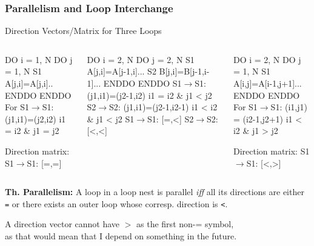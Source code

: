 \documentclass{beamer}
\newcommand{\emp}[1]{\textcolor{DikuRed}{ #1}}
\newcommand{\mymath}[1]{$ #1 $}
\begin{document}
\begin{frame}[fragile,t]
  \frametitle{Parallelism and Loop Interchange} %

\begin{block}{Direction Vectors/Matrix for Three Loops }
\begin{columns}
\begin{colorcode}
  DO i = 1, N
    DO j = 1, N
S1    A[j,i]=A[j,i]..
    ENDDO
  ENDDO
For S1\mymath{\rightarrow}S1: 
    (j1,i1)=(j2,i2) 
    i1 \emp{=} i2 \& j1 \emp{=} j2

Direction matrix:
S1\mymath{\rightarrow}S1: \emp{[=,=]}
\end{colorcode}
\begin{colorcode}
  DO i = 2, N
    DO j = 2, N
S1    A[j,i]=A[j-1,i]...
S2    B[j,i]=B[j-1,i-1]...
    ENDDO
  ENDDO
S1\mymath{\rightarrow}S1: (j1,i1)=(j2-1,i2)
        i1 \emp{=} i2 \& j1 \emp{<} j2
S2\mymath{\rightarrow}S2: (j1,i1)=(j2-1,i2-1)
        i1 \emp{<} i2 \& j1 \emp{<} j2
S1\mymath{\rightarrow}S1: \emp{[=,<]}
S2\mymath{\rightarrow}S2: \emp{[<,<]}
\end{colorcode}
\begin{colorcode}
  DO i = 2, N
    DO j = 1, N
S1    A[i,j]=A[i-1,j+1]...
    ENDDO
  ENDDO
For S1\mymath{\rightarrow}S1: 
    (i1,j1) = (i2-1,j2+1)
    i1 \emp{<} i2 \& j1 \emp{>} j2

Direction matrix:
S1\mymath{\rightarrow}S1: \emp{[<,>]}
\end{colorcode}
\end{columns}
\end{block} 

{\bf Th. Parallelism:} A loop in a loop nest is parallel {\em iff} all its directions
are either {\tt =} or there exists an outer loop whose corresp. direction is {\tt <}. 

\smallskip

\alert{A direction vector cannot have $>$ as the first non-= symbol},\\
as that would mean that I depend on something in the future. 
\end{frame}
\end{document}
